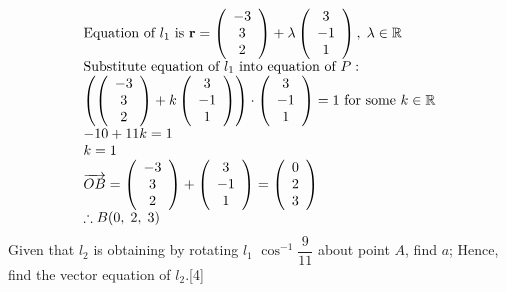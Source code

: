 \documentclass[12pt, a4 paper]{article}
\begin{document}
\begin{outline}[enumerate]
					\[\begin{array}{l}{\textrm{Equation of }}{l_1}{\textrm{ is }}{\bf{r}} = \left( {\begin{array}{*{20}{c}}{ - 3}\\3\\2\end{array}} \right) + \lambda \left( {\begin{array}{*{20}{c}}3\\{ - 1}\\1\end{array}} \right),\;\lambda  \in \mathbb{R}\\{\textrm{Substitute equation of }}{l_1}{\textrm{ into equation of }}P:\\\left( {\left( {\begin{array}{*{20}{c}}{ - 3}\\3\\2\end{array}} \right) + k\left( {\begin{array}{*{20}{c}}3\\{ - 1}\\1\end{array}} \right)} \right) \cdot \left( {\begin{array}{*{20}{c}}3\\{ - 1}\\1\end{array}} \right) = 1{\textrm{ for some }}k \in \mathbb{R}\\ - 10 + 11k = 1\\k = 1\\\overrightarrow {OB}  = \left( {\begin{array}{*{20}{c}}{ - 3}\\3\\2\end{array}} \right) + \left( {\begin{array}{*{20}{c}}3\\{ - 1}\\1\end{array}} \right) = \left( {\begin{array}{*{20}{c}}0\\2\\3\end{array}} \right)\\\therefore B(0,\;2,\;3)\end{array}\]
					\color{black}
					\2 Given that ${l_2}$ is obtaining by rotating ${l_1}$ ${\cos ^{ - 1}}\dfrac{9}{{11}}$ about point $A$, find $a$; Hence, find the vector equation of ${l_2}$.\hfill[4]

\end{outline}
\end{document}
